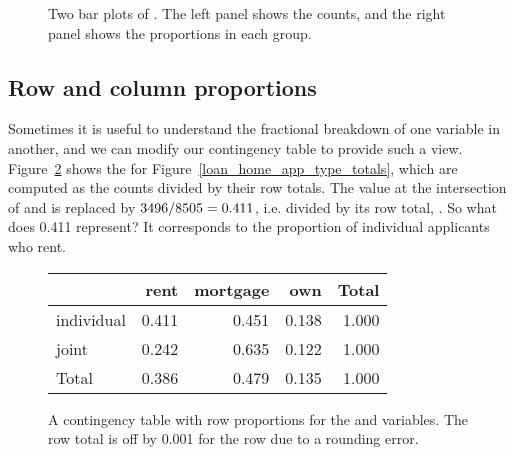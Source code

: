 \begin{figure}[bht]
  \centering
  \caption{Two bar plots of .
      The left panel shows the counts, and the right panel
      shows the proportions in each group.}
  \label{loan_homeownership_bar_plot}
\end{figure}


\subsection{Row and column proportions}

Sometimes it is useful to understand the fractional breakdown
of one variable in another,
and we can modify our contingency table to provide such a view.
Figure~\ref{rowPropAppTypeHomeownership}
shows the
for Figure~\ref{loan_home_app_type_totals},
which are computed as the counts divided by their row totals.
The value \loanapphomeAA{} at the intersection of
 and  is replaced by
$3496{}/8505{} = 0.411$,
i.e. \loanapphomeAA{} divided by its row total,
\loanapphomeAD{}.
So what does 0.411 represent?
It corresponds to the proportion of individual
applicants who rent.

\begin{figure}
\centering
\begin{tabular}{l rrr r}
  \hline
  & rent & mortgage & own & Total \\
  \hline
  individual & 
      0.411 &
      0.451 &
      0.138 &
      1.000 \\
  joint &
      0.242 &
      0.635 &
      0.122 &
      1.000 \\
  \hline
  Total &
      0.386 &
      0.479 &
      0.135 &
      1.000 \\
  \hline
\end{tabular}
\caption{A contingency table with row proportions
    for the  and
     variables.
    The row total is off by 0.001 for the
     row due to a rounding error.}
\label{rowPropAppTypeHomeownership}
\end{figure}

